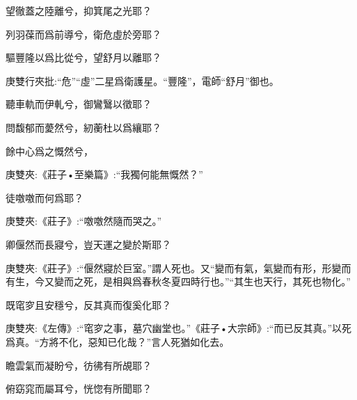 \begin{qute2sp}
\begin{poem}
        \begin{pl}望徹蓋之陸離兮，抑箕尾之光耶？\end{pl}

        \begin{pl}列羽葆而爲前導兮，衛危虛於旁耶？\end{pl}

        \begin{pl}驅豐隆以爲比從兮，望舒月以離耶？\end{pl}
        \begin{note}庚雙行夾批:“危”“虛”二星爲衛護星。“豐隆”，電師“舒月”御也。\end{note}

        \begin{pl}聽車軌而伊軋兮，御鸞鷖以徵耶？\end{pl}

        \begin{pl}問馥郁而薆然兮，紉蘅杜以爲纕耶？\end{pl}

        \begin{pl}餘中心爲之慨然兮，\end{pl}
        \begin{note}庚雙夾:《莊子•至樂篇》:“我獨何能無慨然？”\end{note}徒噭噭而何爲耶？
        \begin{note}庚雙夾:《莊子》:“噭噭然隨而哭之。”\end{note}

        \begin{pl}卿偃然而長寢兮，豈天運之變於斯耶？\end{pl}
        \begin{note}庚雙夾:《莊子》:“偃然寢於巨室。”謂人死也。又“變而有氣，氣變而有形，形變而有生，今又變而之死，是相與爲春秋冬夏四時行也。”“其生也天行，其死也物化。”\end{note}

        \begin{pl}既窀穸且安穩兮，反其真而復奚化耶？\end{pl}
        \begin{note}庚雙夾:《左傳》:“窀穸之事，墓穴幽堂也。”《莊子•大宗師》:“而已反其真。”以死爲真。“方將不化，惡知已化哉？”言人死猶如化去。\end{note}

        \begin{pl}瞻雲氣而凝盼兮，彷彿有所覘耶？\end{pl}

        \begin{pl}俯窈窕而屬耳兮，恍惚有所聞耶？\end{pl}


\end{poem}
\end{qute2sp}
